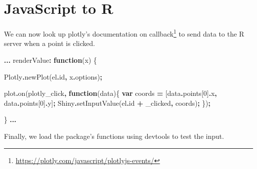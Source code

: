 \documentclass[
]{krantz}
\makeatletter
\newenvironment{Shaded}{\begin{snugshade}}{\end{snugshade}}
\newcommand{\AttributeTok}[1]{\textcolor[rgb]{0.61,0.61,0.61}{#1}}
\newcommand{\DecValTok}[1]{\textcolor[rgb]{0.06,0.06,0.06}{#1}}
\newcommand{\FunctionTok}[1]{\textcolor[rgb]{0,0,0}{#1}}
\newcommand{\KeywordTok}[1]{\textcolor[rgb]{0.27,0.27,0.27}{\textbf{#1}}}
\newcommand{\NormalTok}[1]{#1}
\newcommand{\OperatorTok}[1]{\textcolor[rgb]{0.43,0.43,0.43}{\textbf{#1}}}
\newcommand{\StringTok}[1]{\textcolor[rgb]{0.5,0.5,0.5}{#1}}
\renewcommand{\href}[2]{#2\footnote{\url{#1}}}
\newenvironment{kframe}{%
\medskip{}
\setlength{\fboxsep}{.8em}
 \def\at@end@of@kframe{}%
 \ifinner\ifhmode%
  \def\at@end@of@kframe{\end{minipage}}%
  \begin{minipage}{\columnwidth}%
 \fi\fi%
 \def\FrameCommand##1{\hskip\@totalleftmargin \hskip-\fboxsep
 \colorbox{shadecolor}{##1}\hskip-\fboxsep
     \hskip-\linewidth \hskip-\@totalleftmargin \hskip\columnwidth}%
 \MakeFramed {\advance\hsize-\width
   \@totalleftmargin\z@ \linewidth\hsize
   \@setminipage}}%
 {\par\unskip\endMakeFramed%
 \at@end@of@kframe}
\renewenvironment{Shaded}{\begin{kframe}}{\end{kframe}}
\makeatother
\begin{document}
\hypertarget{widgets-ex-plotly-js-to-r}{%
\section{JavaScript to R}\label{widgets-ex-plotly-js-to-r}}

We can now look up plotly's documentation on \href{https://plotly.com/javascript/plotlyjs-events/}{callback} to send data to the R server when a point is clicked.

\begin{Shaded}
\begin{Highlighting}[]
\OperatorTok{...}
\NormalTok{renderValue}\OperatorTok{:} \KeywordTok{function}\NormalTok{(x) \{}

\NormalTok{  Plotly}\OperatorTok{.}\FunctionTok{newPlot}\NormalTok{(el}\OperatorTok{.}\AttributeTok{id}\OperatorTok{,}\NormalTok{ x}\OperatorTok{.}\AttributeTok{options}\NormalTok{)}\OperatorTok{;}

\NormalTok{  plot}\OperatorTok{.}\FunctionTok{on}\NormalTok{(}\StringTok{\textquotesingle{}plotly\_click\textquotesingle{}}\OperatorTok{,} \KeywordTok{function}\NormalTok{(data)\{}
    \KeywordTok{var}\NormalTok{ coords }\OperatorTok{=}\NormalTok{ [data}\OperatorTok{.}\AttributeTok{points}\NormalTok{[}\DecValTok{0}\NormalTok{]}\OperatorTok{.}\AttributeTok{x}\OperatorTok{,}\NormalTok{ data}\OperatorTok{.}\AttributeTok{points}\NormalTok{[}\DecValTok{0}\NormalTok{]}\OperatorTok{.}\AttributeTok{y}\NormalTok{]}\OperatorTok{;}
\NormalTok{    Shiny}\OperatorTok{.}\FunctionTok{setInputValue}\NormalTok{(el}\OperatorTok{.}\AttributeTok{id} \OperatorTok{+} \StringTok{\textquotesingle{}\_clicked\textquotesingle{}}\OperatorTok{,}\NormalTok{ coords)}\OperatorTok{;}
\NormalTok{  \})}\OperatorTok{;}

\NormalTok{\}}
\OperatorTok{...}
\end{Highlighting}
\end{Shaded}

Finally, we load the package's functions using devtools to test the input.
\end{document}
